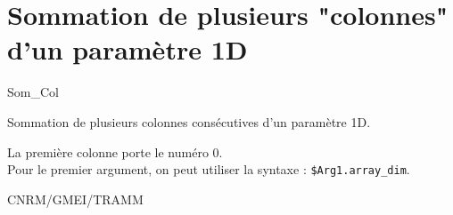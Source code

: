 %
\section{Sommation de plusieurs "colonnes" d'un param\`etre 1D}

 {\sf Som\_Col}


Sommation de plusieurs colonnes cons\'ecutives d'un
param\`etre 1D. 

\bigskip






La premi\`ere colonne porte le num\'ero $0$.\\
Pour le premier argument, on peut utiliser la syntaxe : \texttt{\$Arg1.array\_dim}.

CNRM/GMEI/TRAMM


